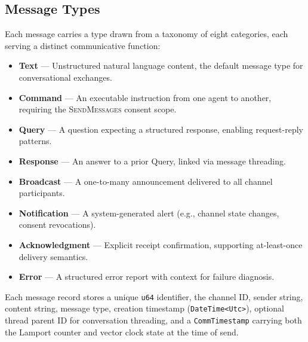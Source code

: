 \documentclass[10pt, twocolumn]{article}
\begin{document}
\subsection{Message Types}
\label{sec:messages}

Each message carries a type drawn from a taxonomy of eight categories, each serving a distinct communicative function:

\begin{itemize}[nosep, leftmargin=*]
  \item \textbf{Text} --- Unstructured natural language content, the default message type for conversational exchanges.
  \item \textbf{Command} --- An executable instruction from one agent to another, requiring the \textsc{SendMessages} consent scope.
  \item \textbf{Query} --- A question expecting a structured response, enabling request-reply patterns.
  \item \textbf{Response} --- An answer to a prior Query, linked via message threading.
  \item \textbf{Broadcast} --- A one-to-many announcement delivered to all channel participants.
  \item \textbf{Notification} --- A system-generated alert (e.g., channel state changes, consent revocations).
  \item \textbf{Acknowledgment} --- Explicit receipt confirmation, supporting at-least-once delivery semantics.
  \item \textbf{Error} --- A structured error report with context for failure diagnosis.
\end{itemize}

Each message record stores a unique \texttt{u64} identifier, the channel ID, sender string, content string, message type, creation timestamp (\texttt{DateTime<Utc>}), optional thread parent ID for conversation threading, and a \texttt{CommTimestamp} carrying both the Lamport counter and vector clock state at the time of send.
\end{document}
